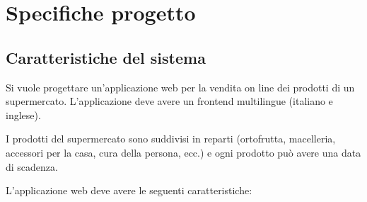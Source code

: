 
\chapter{Specifiche progetto}
\label{cap:specifiche-progetto}

\section{Caratteristiche del sistema}
Si vuole progettare un'applicazione web per la vendita on line dei prodotti di un supermercato.
L'applicazione deve avere un frontend multilingue (italiano e inglese).

I prodotti del supermercato sono suddivisi in reparti (ortofrutta, macelleria, accessori per la casa, cura della persona, ecc.) e ogni prodotto può avere una data di scadenza.

L'applicazione web deve avere le seguenti caratteristiche:

